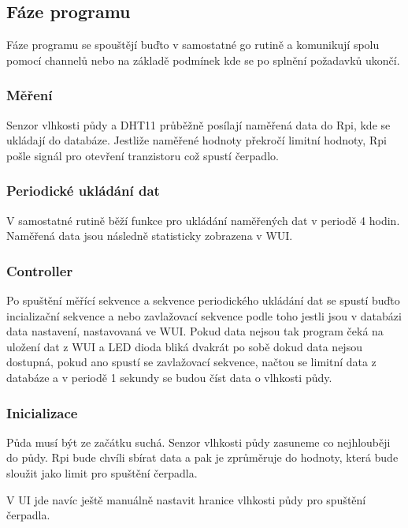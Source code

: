 \documentclass[12pt,a4paper]{article}
\begin{document}
\subsection{Fáze programu}

Fáze programu se spouštějí buďto v samostatné go rutině a komunikují spolu
pomocí channelů nebo na základě podmínek kde se po splnění požadavků ukončí.

\subsubsection{Měření}

Senzor vlhkosti půdy a DHT11 průběžně posílají naměřená data do Rpi, kde se
ukládají do databáze. Jestliže naměřené hodnoty překročí limitní hodnoty, Rpi
pošle signál pro otevření tranzistoru což spustí čerpadlo.

\subsubsection{Periodické ukládání dat}

V samostatné rutině běží funkce pro ukládání naměřených dat v periodě 4 hodin.
Naměřená data jsou následně statisticky zobrazena v \ac{WUI}.

\subsubsection{Controller}

Po spuštění měřící sekvence a sekvence periodického ukládání dat se spustí
buďto incializační sekvence a nebo zavlažovací sekvence podle toho jestli jsou
v databázi data nastavení, nastavovaná ve \ac{WUI}. Pokud data nejsou tak program
čeká na uložení dat z \ac{WUI} a LED dioda bliká dvakrát po sobě dokud data nejsou
dostupná, pokud ano spustí se zavlažovací sekvence, načtou se limitní data z
databáze a v periodě 1 sekundy se budou číst data o vlhkosti půdy.

\subsubsection{Inicializace}

Půda musí být ze začátku suchá. Senzor vlhkosti půdy zasuneme co nejhlouběji do
půdy. Rpi bude chvíli sbírat data a pak je zprůměruje do hodnoty, která bude
sloužit jako limit pro spuštění čerpadla.

V UI jde navíc ještě manuálně nastavit hranice vlhkosti půdy pro spuštění
čerpadla.
\end{document}
